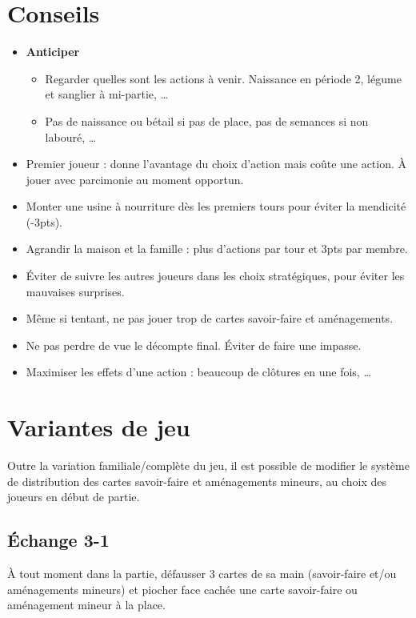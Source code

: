 \documentclass[10pt, a4paper]{article}	%
\begin{document}
\begin{multicols}{3}
\section{Conseils}
\begin{itemize}
\item \textbf{Anticiper}
	\begin{itemize}
	\item Regarder quelles sont les actions à venir. Naissance en période 2, légume et sanglier à mi-partie, \dots
	\item Pas de naissance ou bétail si pas de place, pas de semances si non labouré, \dots
	\end{itemize}
\item \og Premier joueur\fg{} : donne l'avantage du choix d'action mais coûte une action. \`A jouer avec parcimonie au moment opportun.
\item Monter une usine à nourriture dès les premiers tours pour éviter la mendicité (-3pts).
\item Agrandir la maison et la famille : plus d'actions par tour et 3pts par membre.
\item Éviter de suivre les autres joueurs dans les choix stratégiques, pour éviter les mauvaises surprises.
\item Même si tentant, ne pas jouer trop de cartes savoir-faire et aménagements.
\item Ne pas perdre de vue le décompte final. Éviter de faire une impasse.
\item Maximiser les effets d'une action : beaucoup de clôtures en une fois, \dots
\end{itemize}





\section{Variantes de jeu}
Outre la variation familiale/complète du jeu, il est possible de modifier le système de distribution des cartes savoir-faire et aménagements mineurs, au choix des joueurs en début de partie.

\subsection*{Échange 3-1}
\`A tout moment dans la partie, défausser 3 cartes de sa main (savoir-faire et/ou aménagements mineurs) et piocher face cachée une carte savoir-faire ou aménagement mineur à la place.


\end{multicols}
\end{document}
